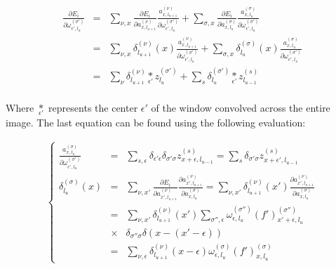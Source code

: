 \documentclass[final, paper=letter,5p,times,twocolumn]{elsarticle}
\begin{document}
\begin{eqnarray}
  \frac{\partial E_{i}}{\partial \omega_{\epsilon',l_{u}}^{(\sigma')}} & = & \sum_{\nu,x} \frac{\partial E_{i}}{\partial a_{x,l_{u+1}}^{(\nu)}} \frac{a_{x,l_{u+1}}^{(\nu)}}{\partial \omega_{\epsilon',l_{u}}^{(\sigma')}} + \sum_{\sigma,x} \frac{\partial E_{i}}{\partial a_{x,l_{u}}^{(\sigma)}} \frac{a_{x,l_{u}}^{(\sigma)}}{\partial \omega_{\epsilon',l_{u}}^{(\sigma')}} \\
 & = & \sum_{\nu,x} \delta_{l_{u+1}}^{(\nu)}(x) \frac{a_{x,l_{u+1}}^{(\nu)}}{\partial \omega_{\epsilon',l_{u}}^{(\sigma')}} + \sum_{\sigma,x} \delta_{l_{u}}^{(\sigma)}(x) \frac{a_{x,l_{u}}^{(\sigma)}}{\partial \omega_{\epsilon',l_{u}}^{(\sigma')}} \\
 & = & \sum_{\nu} \delta_{l_{u+1}}^{(\nu)} \underset{\epsilon'}{*} z_{l_{u}}^{(\sigma')}  + \sum_{s} \delta_{l_{u}}^{(\sigma')} \underset{\epsilon'}{*} z_{l_{u-1}}^{(s)}  \\
\end{eqnarray}
\label{equa:AE_1}

Where $\underset{\epsilon'}{*}$ represents the center $\epsilon'$ of the window convolved across the entire image. The last equation can be found using the following evaluation:

\begin{eqnarray*}
  \left \lbrace
  \begin{array}{rcl}
    \frac{a_{x,l_{u}}^{(\sigma)}}{\partial \omega_{\epsilon',l_{u}}^{(\sigma')}} & = & \sum_{s,\epsilon} \delta_{\epsilon' \epsilon} \delta_{\sigma' \sigma} z_{x+\epsilon,l_{u-1}}^{(s)} = \sum_{s} \delta_{\sigma' \sigma} z_{x+\epsilon',l_{u-1}}^{(s)}\\
    \delta_{l_{u}}^{(\sigma)}(x) & = & \sum_{\nu,x'} \frac{\partial E_{i}}{\partial a_{x',l_{u+1}}^{(\nu)}}\frac{\partial a_{x',l_{u+1}}^{(\nu)}}{\partial a_{x,l_{u}}^{(\sigma)}} = \sum_{\nu,x'} \delta_{l_{u+1}}^{(\nu)}(x')\frac{\partial a_{x',l_{u+1}}^{(\nu)}}{\partial a_{x,l_{u}}^{(\sigma)}} \\
    & = & \sum_{\nu,x'} \delta_{l_{u+1}}^{(\nu)}(x') \sum_{\sigma'',\epsilon} \omega_{\epsilon,l_{u}}^{(\sigma'')} (f')_{x'+\epsilon,l_{u}}^{(\sigma'')} \\
    & \times & \delta_{\sigma'' \sigma} \delta(x - (x'-\epsilon)) \\
    & = & \sum_{\nu,\epsilon} \delta_{l_{u+1}}^{(\nu)}(x-\epsilon) \omega_{\epsilon,l_{u}}^{(\sigma)} (f')_{x,l_{u}}^{(\sigma)}
  \end{array}
  \right .
\end{eqnarray*}
\end{document}
